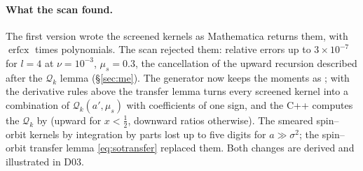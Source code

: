 \documentclass[11pt,a4paper]{article}
\numberwithin{equation}{section}
\theoremstyle{definition}
\theoremstyle{plain}
\theoremstyle{remark}
\numberwithin{algorithm}{section}
\newcommand{\erfcx}{\operatorname{erfcx}}
\newcommand{\mus}{\mu_s}
\begin{document}
\paragraph{What the scan found.} The first version wrote the screened kernels as Mathematica returns them, with $\erfcx$ times polynomials. The scan rejected them: relative errors up to $3\times10^{-7}$ for $l=4$ at $\nu=10^{-3}$, $\mus=0.3$, the cancellation of the upward recursion described after the $\mathcal Q_k$ lemma (\S\ref{sec:me}). The generator now keeps the moments as ; with the derivative rules above the transfer lemma turns every screened kernel into a combination of $\mathcal Q_k(a',\mus)$ with coefficients of one sign, and the C++ computes the $\mathcal Q_k$ by  (upward for $x<\frac12$, downward ratios otherwise). The smeared spin--orbit kernels by integration by parts lost up to five digits for $a\gg\sigma^2$; the spin--orbit transfer lemma \eqref{eq:sotransfer} replaced them. Both changes are derived and illustrated in D03.
\end{document}
